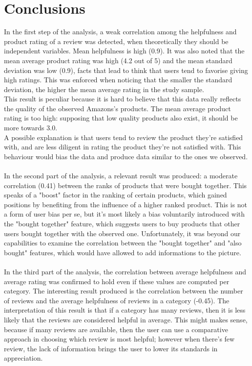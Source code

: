 \documentclass[11pt]{article}
\begin{document}
\section{Conclusions}
In the first step of the analysis, a weak correlation among the helpfulness and product rating of a review was detected, when theoretically they should be independent variables. Mean helpfulness is high (0.9). It was also noted that the mean average product rating was high (4.2 out of 5) and the mean standard deviation was low (0.9), facts that lead to think that users tend to favorise giving high ratings. This was enforced when noticing that the smaller the standard deviation, the higher the mean average rating in the study sample. \\
This result is peculiar because it is hard to believe that this data really reflects the quality of the observed Amazons's products. The mean average product rating is too high: supposing that low quality products also exist, it should be more towards 3.0. 
\\A possible explanation is that users tend to review the product they're satisfied with, and are less diligent in rating the product they're not satisfied with. This behaviour would bias the data and produce data similar to the ones we observed.\\\\
In the second part of the analysis, a relevant result was produced: a moderate correlation (0.41) between the ranks of products that were bought together. This speaks of a "boost" factor in the ranking of certain products, which gained positions by benefiting from the influence of a higher ranked product. This is not a form of user bias per se, but it's most likely  a bias voluntarily introduced with the "bought together" feature, which suggests users to buy products that other users bought together with the observed one. Unfortunately, it was beyond our capabilities to examine the correlation between the "bought together" and  "also bought"  features, which would have allowed to add informations to the picture.\\\\
In the third part of the analysis, the correlation between average helpfulness and average rating was confirmed to hold even if these values are computed per category. The interesting result produced is the correlation between the number of reviews and the average helpfulness of reviews in a category (-0.45). The interpretation of this result is that if a category has many reviews, then it is less likely that the reviews are considered helpful in average. This might makes sense, because if many reviews are available, then the user can use a comparative approach in choosing which review is most helpful; however when there's few review, the lack of information brings the user to lower its standards in appreciation. \\\\
\end{document}
